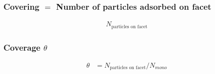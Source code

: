 \subsubsection*{Covering $=$ Number of particles adsorbed on facet}
\begin{equation}
	\begin{split}
		N_{\text{particles on facet}}
	\end{split}
\end{equation}

\subsubsection*{Coverage $\theta$}
\begin{equation}
	\label{eq:cov}
	\begin{split}
		\theta&=N_{\text{particles on facet}}/N_{mono}
	\end{split}
\end{equation}

